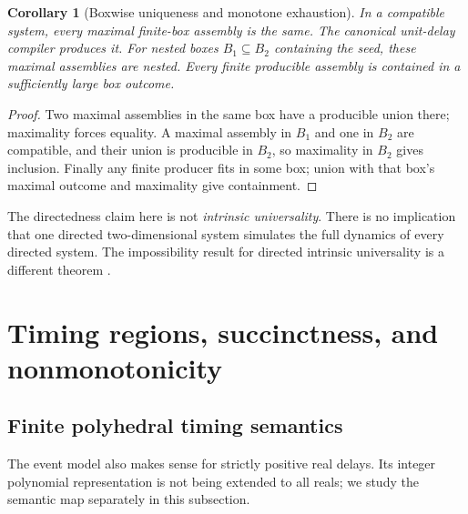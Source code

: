 \documentclass[11pt,letterpaper]{article}
\newtheorem{corollary}[theorem]{Corollary}
\theoremstyle{definition}
\theoremstyle{remark}
\begin{document}
\begin{corollary}[Boxwise uniqueness and monotone exhaustion]\label{qoc:ts:cor:box}
In a compatible system, every maximal finite-box assembly is the same.
The canonical unit-delay compiler produces it. For nested boxes
$B_1\subseteq B_2$ containing the seed, these maximal assemblies are
nested. Every finite producible assembly is contained in a sufficiently
large box outcome.
\end{corollary}
\begin{proof}
Two maximal assemblies in the same box have a producible union there;
maximality forces equality. A maximal assembly in $B_1$ and one in $B_2$
are compatible, and their union is producible in $B_2$, so maximality in
$B_2$ gives inclusion. Finally any finite producer fits in some box;
union with that box's maximal outcome and maximality give containment.
\end{proof}

The directedness claim here is not \emph{intrinsic universality}. There is
no implication that one directed two-dimensional system simulates the full
dynamics of every directed system. The impossibility result for directed
intrinsic universality is a different theorem \cite{ts:hendricks}.

\section{Timing regions, succinctness, and nonmonotonicity}
\subsection{Finite polyhedral timing semantics}
The event model also makes sense for strictly positive real delays.
Its integer polynomial representation is not being extended to all reals;
we study the semantic map separately in this subsection.
\end{document}
